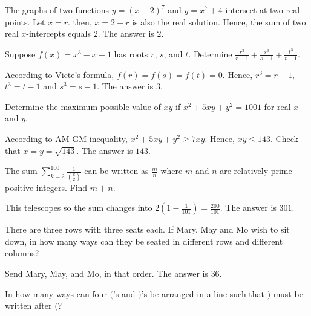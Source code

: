 \begin{solution}
The graphs of two functions $y=(x-2)^7$ and $y=x^7+4$ intersect at two real points. Let $x=r$. then, $x=2-r$ is also the real solution. Hence, the sum of two real $x$-intercepts equals $2$. The answer is $2$.
\end{solution}

\begin{problem}
Suppose $f(x)=x^3-x+1$ has roots $r$, $s$, and $t$. Determine $\frac{r^3}{r-1}+\frac{s^3}{s-1}+\frac{t^3}{t-1}$.
\end{problem}

\begin{solution}
According to Viete's formula, $f(r)=f(s)=f(t)=0$. Hence, $r^3=r-1$, $t^3=t-1$ and $s^3=s-1$. The answer is $3$. 
\end{solution}

\begin{problem}
Determine the maximum possible value of $xy$ if $x^2+5xy+y^2=1001$ for real $x$ and $y$.
\end{problem}

\begin{solution}
According to AM-GM inequality, $x^2+5xy+y^2\geq 7xy$. Hence, $xy\leq 143$. Check that $x=y=\sqrt{143}$. The answer is $143$.
\end{solution}

\begin{problem}
The sum $\sum_{k=2}^{100}\frac{1}{\binom{k}{2}}$ can be written as $\frac{m}{n}$ where $m$ and $n$ are relatively prime positive integers. Find $m+n$.
\end{problem}

\begin{solution}
This telescopes so the sum changes into $2(1-\frac{1}{101})=\frac{200}{101}$. The answer is $301$.
\end{solution}

\begin{problem}
There are three rows with three seats each. If Mary, May and Mo wish to sit down, in how many ways can they be seated in different rows and different columns?
\end{problem}

\begin{solution}
Send Mary, May, and Mo, in that order. The answer is $36$.
\end{solution}

\begin{problem}
In how many ways can four $($'s and $)$'s be arranged in a line such that $)$ must be written after $($?
\end{problem}

